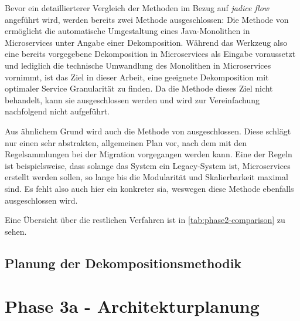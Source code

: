 Bevor ein detaillierterer Vergleich der Methoden im Bezug auf \emph{jadice flow} angeführt wird, werden bereits zwei Methode ausgeschlossen:
Die Methode von  ermöglicht die automatische Umgestaltung eines Java-Monolithen in Microservices unter Angabe einer Dekomposition.
Während das Werkzeug also eine bereits vorgegebene Dekomposition in Microservices als Eingabe voraussetzt und lediglich die technische Umwandlung des Monolithen in Microservices vornimmt, ist das Ziel in dieser Arbeit, eine geeignete Dekomposition mit optimaler Service Granularität zu finden.
Da die Methode dieses Ziel nicht behandelt, kann sie ausgeschlossen werden und wird zur Vereinfachung nachfolgend nicht aufgeführt.

Aus ähnlichem Grund wird auch die Methode von  ausgeschlossen.
Diese schlägt nur einen sehr abstrakten, allgemeinen Plan vor, nach dem mit den Regelsammlungen bei der Migration vorgegangen werden kann.
Eine der Regeln ist beispielsweise, dass solange das System ein Legacy-System ist, Microservices erstellt werden sollen, so lange bis die Modularität und Skalierbarkeit maximal sind.
Es fehlt also auch hier ein konkreter \gls{sia}, weswegen diese Methode ebenfalls ausgeschlossen wird.

Eine Übersicht über die restlichen Verfahren ist in \cref{tab:phase2-comparison} zu sehen.



\subsection{Planung der Dekompositionsmethodik}

\section{Phase 3a - Architekturplanung}
\label{sec:durchführung-phase3}

